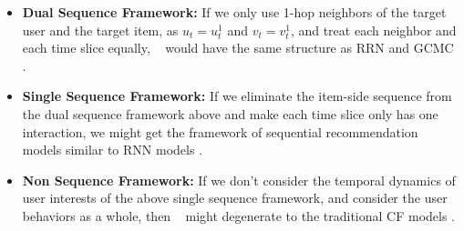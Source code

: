 \begin{itemize}[leftmargin=15pt]
	\item \textbf{Dual Sequence Framework:} If we only use 1-hop neighbors of the target user and the target item, as $u_t = u_t^1$ and $v_t = v_t^1$, and treat each neighbor and each time slice equally, \score~ would have the same structure as RRN \cite{wu2017recurrent} and GCMC \cite{fadel2018link}.
	\item \textbf{Single Sequence Framework:} If we eliminate the item-side sequence from the dual sequence framework above and make each time slice only has one interaction, we might get the framework of sequential recommendation models similar to RNN models \cite{hidasi2015session,ren2019lifelong,zhou2018deepb}.
	\item \textbf{Non Sequence Framework:} If we don't consider the temporal dynamics of user interests of the above single sequence framework, and consider the user behaviors as a whole, then \score~ might degenerate to the traditional CF models \cite{koren2008factorization}.
\end{itemize}
